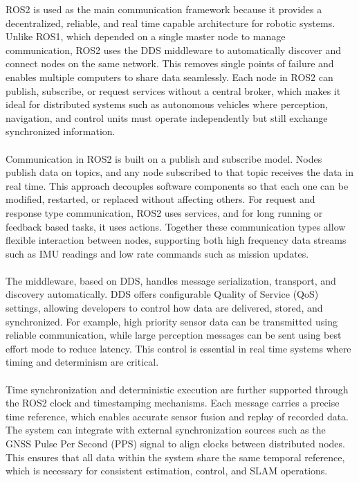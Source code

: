 \noindent
ROS2 is used as the main communication framework because it provides a decentralized, reliable, and real time capable architecture for robotic systems. Unlike ROS1, which depended on a single master node to manage communication, ROS2 uses the DDS middleware to automatically discover and connect nodes on the same network. This removes single points of failure and enables multiple computers to share data seamlessly. Each node in ROS2 can publish, subscribe, or request services without a central broker, which makes it ideal for distributed systems such as autonomous vehicles where perception, navigation, and control units must operate independently but still exchange synchronized information.  
\\ \\
Communication in ROS2 is built on a publish and subscribe model. Nodes publish data on topics, and any node subscribed to that topic receives the data in real time. This approach decouples software components so that each one can be modified, restarted, or replaced without affecting others. For request and response type communication, ROS2 uses services, and for long running or feedback based tasks, it uses actions. Together these communication types allow flexible interaction between nodes, supporting both high frequency data streams such as IMU readings and low rate commands such as mission updates.  
\\ \\
The middleware, based on DDS, handles message serialization, transport, and discovery automatically. DDS offers configurable Quality of Service (QoS) settings, allowing developers to control how data are delivered, stored, and synchronized. For example, high priority sensor data can be transmitted using reliable communication, while large perception messages can be sent using best effort mode to reduce latency. This control is essential in real time systems where timing and determinism are critical.  
\\ \\
Time synchronization and deterministic execution are further supported through the ROS2 clock and timestamping mechanisms. Each message carries a precise time reference, which enables accurate sensor fusion and replay of recorded data. The system can integrate with external synchronization sources such as the GNSS Pulse Per Second (PPS) signal to align clocks between distributed nodes. This ensures that all data within the system share the same temporal reference, which is necessary for consistent estimation, control, and SLAM operations.  
